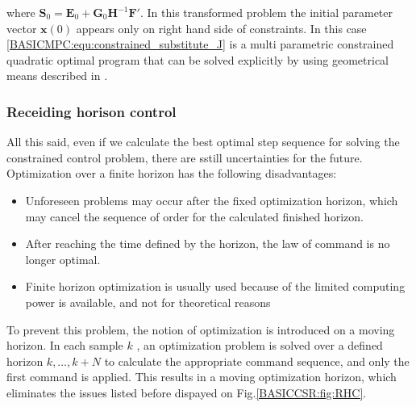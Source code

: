     where $\textbf{S}_0=\textbf{E}_0+\textbf{G}_0\textbf{H}^{-1}\textbf{F}'$. In this transformed problem the initial parameter vector $\textbf{x}(0)$ appears only on right hand side of constraints. In this case \ref{BASICMPC:equ:constrained_substitute_J} is a multi parametric constrained quadratic optimal program that can be solved explicitly by using geometrical means described in \cite{bemporad2002explicit}.
    
    \subsubsection{Receiding horison control}\label{BASICCSR:sec:RHC}
    
    All this said, even if we calculate the best optimal step sequence for solving the constrained control problem, there are sstill uncertainties for the future. Optimization over a finite horizon has the following disadvantages:
		
		\begin{itemize}
			\item Unforeseen problems may occur after the fixed optimization horizon, which may cancel the sequence of order for the 		calculated finished horizon.
		\item After reaching the time defined by the horizon, the law of command is no longer optimal.
		\item Finite horizon optimization is usually used because of the limited computing power is available, and not for theoretical reasons
		\end{itemize}
		
		To prevent this problem, the notion of optimization is introduced on a moving horizon. In each sample $k$ , an optimization problem is solved over a defined horizon $k,\dots,k+N$ to calculate the appropriate command sequence, and only the first command is applied. This results in a moving optimization horizon, which eliminates the issues listed before dispayed on Fig.\ref{BASICCSR:fig:RHC}. \\

